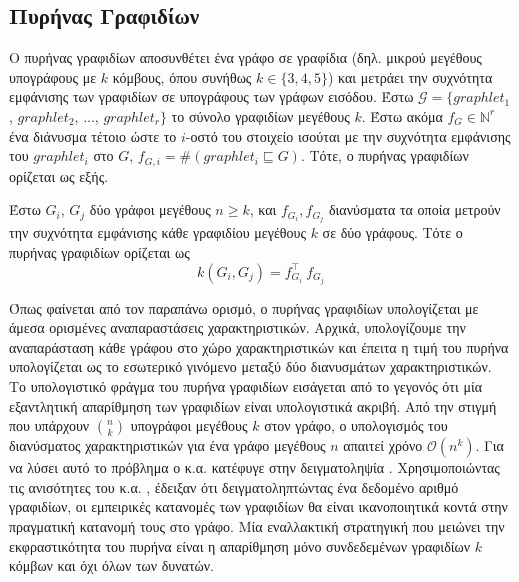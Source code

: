\subsection{Πυρήνας Γραφιδίων}
\label{ssec:gr}
Ο πυρήνας γραφιδίων αποσυνθέτει ένα γράφο σε γραφίδια (δηλ. μικρού μεγέθους υπογράφους με $k$ κόμβους, όπου συνήθως $k \in \{ 3,4,5\}$) \cite{prvzulj2007biological} και μετράει την συχνότητα εμφάνισης των γραφιδίων σε υπογράφους των γράφων εισόδου.
Έστω $\mathcal{G} = \{ graphlet_1$, $graphlet_2$, $\ldots$, $graphlet_r\}$ το σύνολο γραφιδίων μεγέθους $k$.
Έστω ακόμα $f_G \in \mathbb{N}^r$ ένα διάνυσμα τέτοιο ώστε το $i$-οστό του στοιχείο ισούται με την συχνότητα εμφάνισης του
$graphlet_i$ στο $G$, $f_{G,i} = \#(graphlet_i \sqsubseteq G)$.
Τότε, ο πυρήνας γραφιδίων ορίζεται ως εξής.
\begin{definition}
	Έστω $G_i$, $G_j$ δύο γράφοι μεγέθους $n \geq k$, και $f_{G_i}, f_{G_j}$ διανύσματα τα οποία μετρούν την συχνότητα εμφάνισης κάθε γραφιδίου μεγέθους $k$ σε δύο γράφους. 
	Τότε ο πυρήνας γραφιδίων ορίζεται ως
	\begin{equation}
  		k(G_i,G_j) = f_{G_i}^\top \ f_{G_j}
  	\end{equation}
\end{definition}
Όπως φαίνεται από τον παραπάνω ορισμό, ο πυρήνας γραφιδίων υπολογίζεται με άμεσα ορισμένες αναπαραστάσεις χαρακτηριστικών.
Αρχικά, υπολογίζουμε την αναπαράσταση κάθε γράφου στο χώρο χαρακτηριστικών και έπειτα η τιμή του πυρήνα υπολογίζεται ως το εσωτερικό γινόμενο μεταξύ δύο διανυσμάτων χαρακτηριστικών.
Το υπολογιστικό φράγμα του πυρήνα γραφιδίων εισάγεται από το γεγονός ότι μία εξαντλητική απαρίθμηση των γραφιδίων είναι υπολογιστικά ακριβή.
Από την στιγμή που υπάρχουν $\binom{n}{k}$ υπογράφοι μεγέθους $k$ στον γράφο, ο υπολογισμός του διανύσματος χαρακτηριστικών για ένα γράφο μεγέθους $n$ απαιτεί χρόνο $\mathcal{O}(n^k)$.
Για να λύσει αυτό το πρόβλημα ο  κ.α. κατέφυγε στην δειγματοληψία \cite{shervashidze2009efficient}. 
Χρησιμοποιώντας τις ανισότητες του  κ.α. \cite{weissman2003inequalities}, έδειξαν ότι δειγματοληπτώντας ένα δεδομένο αριθμό γραφιδίων, οι εμπειρικές κατανομές των γραφιδίων θα είναι ικανοποιητικά κοντά στην πραγματική κατανομή τους στο γράφο.
Μία εναλλακτική στρατηγική που μειώνει την εκφραστικότητα του πυρήνα είναι η απαρίθμηση μόνο συνδεδεμένων γραφιδίων $k$ κόμβων και όχι όλων των δυνατών.


